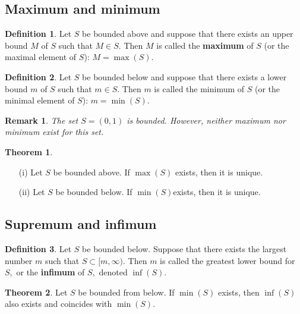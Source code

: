 \documentclass[12pt, a4paper]{article}
\newtheorem*{remark}{Remark}
\theoremstyle{definition}
\newtheorem{definition}{Definition}[section]
\newtheorem{theorem}{Theorem}[section]
\theoremstyle{plain}
\begin{document}
\subsection{Maximum and minimum}

\begin{definition}
Let $S$ be bounded above and suppose that there exists an upper bound $M$ of $S$ such that $M \in S.$ Then $M$ is called the \textbf{maximum} of $S$ (or the maximal element of $S$): $M = \max(S).$
\end{definition}

\begin{definition}
Let $S$ be bounded below and suppose that there exists a lower bound $m$ of $S$ such that $m \in S.$ Then $m$ is called the minimum of $S$ (or the minimal element of $S$): $m = \min(S).$
\end{definition}

\begin{remark}
The set $S=(0,1)$ is bounded. However, neither maximum nor minimum exist for this set.
\end{remark}

\begin{theorem} \hphantom{This is to make space for formatting}
\begin{enumerate}
	
	\item[(i)] Let $S$ be bounded above. If $\max(S)$ exists, then it is unique.

	\item[(ii)] Let $S$ be bounded below. If $\min(S)$exists, then it is unique.

\end{enumerate}
\end{theorem}

\subsection{Supremum and infimum}

\begin{definition}
Let $S$ be bounded below. Suppose that there exists the largest number $m$ such that $S \subset [m, \infty).$ Then $m$ is called the greatest lower bound for $S,$ or the \textbf{infimum} of $S,$ denoted $\inf(S).$
\end{definition}

\begin{theorem}
Let $S$ be bounded from below. If $\min(S)$ exists, then $\inf(S)$ also exists and coincides with $\min(S).$
\end{theorem}
\end{document}
